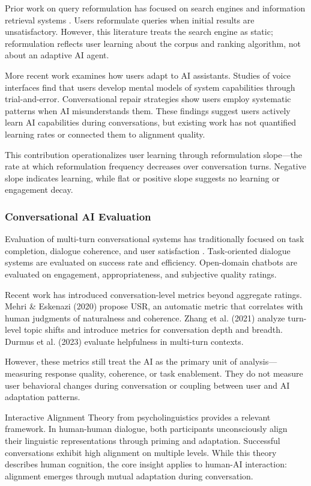 Prior work on query reformulation has focused on search engines and information retrieval systems \citep{huang2009query}. Users reformulate queries when initial results are unsatisfactory. However, this literature treats the search engine as static; reformulation reflects user learning about the corpus and ranking algorithm, not about an adaptive AI agent.

More recent work examines how users adapt to AI assistants. Studies of voice interfaces \citep{luger2016like} find that users develop mental models of system capabilities through trial-and-error. Conversational repair strategies \citep{ashktorab2019resilient} show users employ systematic patterns when AI misunderstands them. These findings suggest users actively learn AI capabilities during conversations, but existing work has not quantified learning rates or connected them to alignment quality.

This contribution operationalizes user learning through reformulation slope---the rate at which reformulation frequency decreases over conversation turns. Negative slope indicates learning, while flat or positive slope suggests no learning or engagement decay.

\subsubsection{Conversational AI Evaluation}

Evaluation of multi-turn conversational systems has traditionally focused on task completion, dialogue coherence, and user satisfaction \citep{walker1997paradise}. Task-oriented dialogue systems are evaluated on success rate and efficiency. Open-domain chatbots are evaluated on engagement, appropriateness, and subjective quality ratings.

Recent work has introduced conversation-level metrics beyond aggregate ratings. Mehri \& Eskenazi (2020) propose USR, an automatic metric that correlates with human judgments of naturalness and coherence. Zhang et al. (2021) analyze turn-level topic shifts and introduce metrics for conversation depth and breadth. Durmus et al. (2023) evaluate helpfulness in multi-turn contexts.

However, these metrics still treat the AI as the primary unit of analysis---measuring response quality, coherence, or task enablement. They do not measure user behavioral changes during conversation or coupling between user and AI adaptation patterns.

Interactive Alignment Theory from psycholinguistics \citep{pickering2004toward} provides a relevant framework. In human-human dialogue, both participants unconsciously align their linguistic representations through priming and adaptation. Successful conversations exhibit high alignment on multiple levels. While this theory describes human cognition, the core insight applies to human-AI interaction: alignment emerges through mutual adaptation during conversation.

